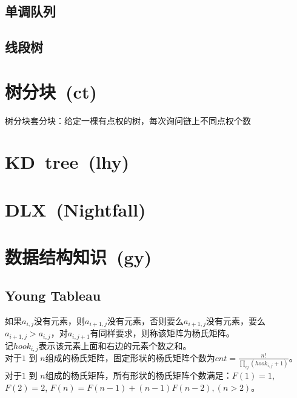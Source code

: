     \subsection*{单调队列}
    \subsection*{线段树}

\section{树分块\ \small(ct)}
    树分块套分块：给定一棵有点权的树，每次询问链上不同点权个数

\section{KD\ tree\ \small(lhy)}

\section{DLX\ \small(Nightfall)}

\section{数据结构知识\ \small(gy)}
    \subsection*{Young Tableau}
        如果$ a_{i, j} $没有元素，则$ a_{i + 1, j} $没有元素，否则要么$ a_{i + 1, j} $没有元素，要么$ a_{i + 1, j} > a_{i, j} $，对$ a_{i, j + 1} $有同样要求，则称该矩阵为杨氏矩阵。\\
        记$ hook_{i, j} $表示该元素上面和右边的元素个数之和。\\
        对于$ 1 $ 到 $ n $组成的杨氏矩阵，固定形状的杨氏矩阵个数为$ cnt = \frac{n!}{\prod\limits_{ij} (hook_{i, j} + 1)} $。\\
        对于$ 1 $ 到 $ n $组成的杨氏矩阵，所有形状的杨氏矩阵个数满足：$ F(1) = 1 $, $ F(2) = 2 $, $ F(n) = F(n - 1) + (n - 1) F(n - 2), (n > 2) $。
